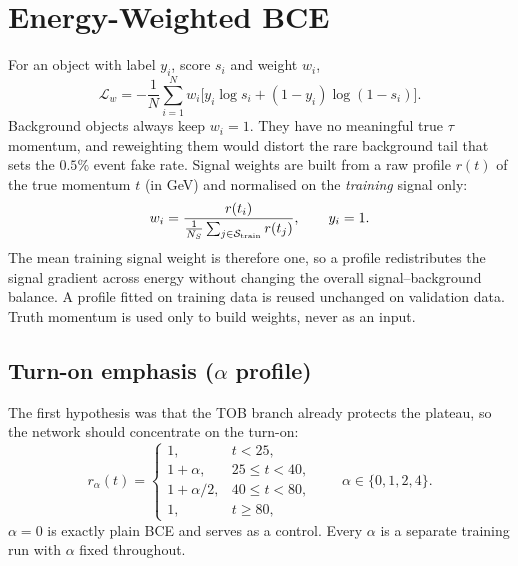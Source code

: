 \section{Energy-Weighted BCE}
\label{app:weighting}
For an object with label $y_i$, score $s_i$ and weight $w_i$,
\begin{equation}
  \mathcal{L}_{w}=-\frac1N\sum_{i=1}^{N}w_i\big[y_i\log s_i+(1-y_i)\log(1-s_i)\big].
\end{equation}
Background objects always keep $w_i=1$. They have no meaningful true $\tau$ momentum, and reweighting them would distort the rare background tail that sets the $0.5\%$ event fake rate. Signal weights are built from a raw profile $r(t)$ of the true momentum $t$ (in GeV) and normalised on the \emph{training} signal only:
\begin{equation}
  w_i=\frac{r(t_i)}{\frac{1}{N_S}\sum_{j\in\mathcal{S}_{\mathrm{train}}}r(t_j)},\qquad y_i=1 .
\end{equation}
The mean training signal weight is therefore one, so a profile redistributes the signal gradient across energy without changing the overall signal--background balance. A profile fitted on training data is reused unchanged on validation data. Truth momentum is used only to build weights, never as an input.

\subsection{Turn-on emphasis (\texorpdfstring{$\alpha$}{alpha} profile)}
The first hypothesis was that the TOB branch already protects the plateau, so the network should concentrate on the turn-on:
\begin{equation}
  r_\alpha(t)=\begin{cases}1,& t<25,\\ 1+\alpha,& 25\leq t<40,\\ 1+\alpha/2,& 40\leq t<80,\\ 1,& t\geq80,\end{cases}
  \qquad \alpha\in\{0,1,2,4\}.
\end{equation}
$\alpha=0$ is exactly plain BCE and serves as a control. Every $\alpha$ is a separate training run with $\alpha$ fixed throughout.

